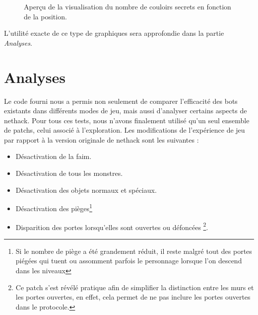 \documentclass[a4paper,12pt]{article}
\begin{document}
\begin{figure}[H]
  \caption{\label{fig:move_graph} Aperçu de la visualisation du nombre de
    couloirs secrets en fonction de la position.}
\end{figure}

L'utilité exacte de ce type de graphiques sera approfondie dans la partie
{\em Analyses}.


\section{Analyses}

Le code fourni nous a permis non seulement de comparer l'efficacité des bots
existants dans différents modes de jeu, mais aussi d'analyser certains aspects
de nethack. Pour tous ces tests, nous n'avons finalement utilisé qu'un seul
ensemble de patchs, celui associé à l'exploration. Les modifications de
l'expérience de jeu par rapport à la version originale de nethack sont les
suivantes :

\begin{itemize}
\item Désactivation de la faim.
\item Désactivation de tous les monstres.
\item Désactivation des objets normaux et spéciaux.
\item Désactivation des pièges\footnote{Si le nombre de piège a été grandement
  réduit, il reste malgré tout des portes piégées qui tuent ou assomment parfois
  le personnage lorsque l'on descend dans les niveaux}
\item Disparition des portes lorsqu'elles sont ouvertes ou défoncées
  \footnote{Ce patch s'est révélé pratique afin de simplifier la distinction
    entre les murs et les portes ouvertes, en effet, cela permet de ne pas
    inclure les portes ouvertes dans le protocole.}.
\end{itemize}
\end{document}
